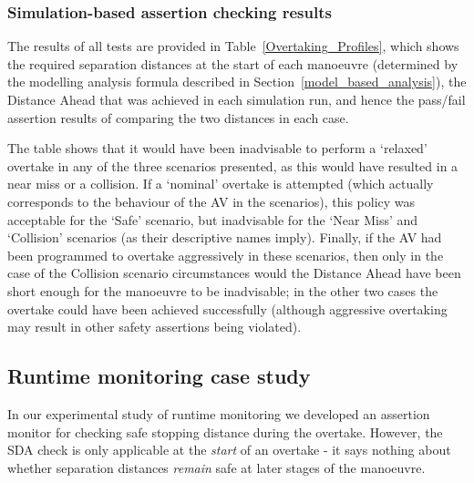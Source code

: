 
\subsubsection{Simulation-based assertion checking results} \label{sim_results}

The results of all tests are provided in Table~\ref{Overtaking_Profiles}, which shows the required separation distances at the start of each manoeuvre (determined by the modelling analysis formula described in Section~\ref{model_based_analysis}), the Distance Ahead that was achieved in each simulation run, and hence the pass/fail assertion results of comparing the two distances in each case.



The table shows that it would have been inadvisable to perform a `relaxed' overtake in any of the three scenarios presented, as this would have resulted in a near miss or a collision. If a `nominal' overtake is attempted (which actually corresponds to the behaviour of the AV in the scenarios), this policy was acceptable for the `Safe' scenario, but inadvisable for the `Near Miss' and `Collision' scenarios (as their descriptive names imply). Finally, if the AV had been programmed to overtake aggressively in these scenarios, then only in the case of the Collision scenario circumstances would the Distance Ahead have been short enough for the manoeuvre to be inadvisable; in the other two cases the overtake could have been achieved successfully (although aggressive overtaking may result in other safety assertions being violated).

\subsection{Runtime monitoring case study}
In our experimental study of runtime monitoring we developed an assertion monitor for checking safe stopping distance during the overtake. However, the SDA check is only applicable at the \textit{start} of an overtake - it says nothing about whether separation distances \textit{remain} safe at later stages of the manoeuvre.

